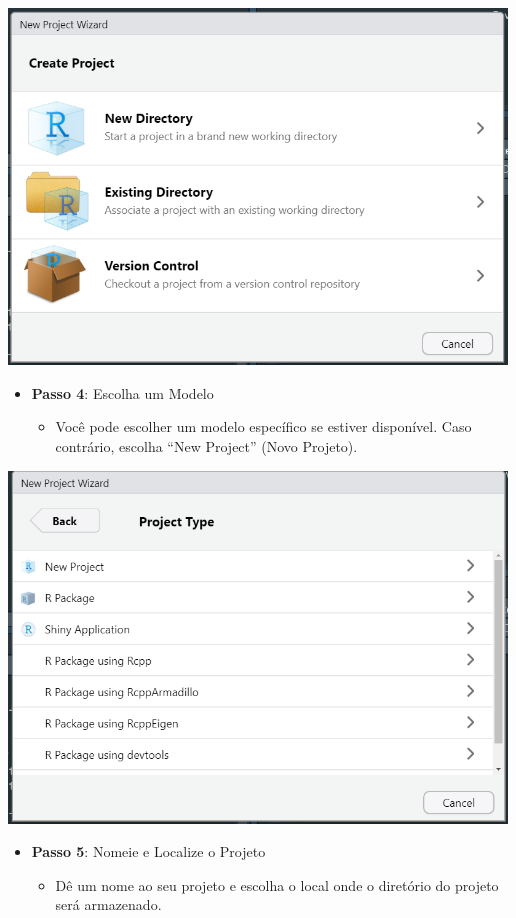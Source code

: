 \documentclass[
  letterpaper,
  DIV=11,
  numbers=noendperiod]{scrartcl}
\providecommand{\tightlist}{%
  \setlength{\itemsep}{0pt}\setlength{\parskip}{0pt}}\usepackage{longtable,booktabs,array}
\begin{document}
\includegraphics[width=5.20833in,height=\textheight]{Figuras/proj_2.png}

\begin{itemize}
\item
  \textbf{Passo 4}: Escolha um Modelo

  \begin{itemize}
  \tightlist
  \item
    Você pode escolher um modelo específico se estiver disponível. Caso
    contrário, escolha ``New Project'' (Novo Projeto).
  \end{itemize}
\end{itemize}

\includegraphics[width=5.20833in,height=\textheight]{Figuras/proj_3.png}

\begin{itemize}
\item
  \textbf{Passo 5}: Nomeie e Localize o Projeto

  \begin{itemize}
  \tightlist
  \item
    Dê um nome ao seu projeto e escolha o local onde o diretório do
    projeto será armazenado.
  \end{itemize}
\end{itemize}
\end{document}
